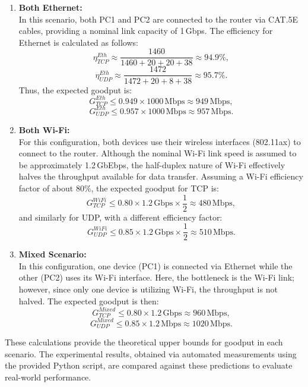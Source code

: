         \begin{enumerate}

            \item \textbf{Both Ethernet:} \\
            In this scenario, both PC1 and PC2 are connected to the router via CAT.5E cables, providing a nominal link capacity of 1\,Gbps. 
            The efficiency for Ethernet is calculated as follows:
            \[
            \eta_{TCP}^{Eth} \approx \frac{1460}{1460 + 20 + 20 + 38} \approx 94.9\%,
            \]
            \[
            \eta_{UDP}^{Eth} \approx \frac{1472}{1472 + 20 + 8 + 38} \approx 95.7\%.
            \]
            Thus, the expected goodput is:
            \[
            G_{TCP}^{Eth} \leq 0.949 \times 1000\,\text{Mbps} \approx 949\,\text{Mbps},
            \]
            \[
            G_{UDP}^{Eth} \leq 0.957 \times 1000\,\text{Mbps} \approx 957\,\text{Mbps}.
            \]

            \vspace{0.2cm} %

            \item \textbf{Both Wi-Fi:} \\
            For this configuration, both devices use their wireless interfaces (802.11ax) to connect to the router. 
            Although the nominal Wi-Fi link speed is assumed to be approximately 1.2\,GbEbps, the half-duplex nature of Wi-Fi effectively halves the throughput available for data transfer. 
            Assuming a Wi-Fi efficiency factor of about 80\%, the expected goodput for TCP is:
            \[
            G_{TCP}^{WiFi} \leq 0.80 \times 1.2\,\text{Gbps} \times \frac{1}{2} \approx 480\,\text{Mbps},
            \]
            and similarly for UDP, with a different efficiency factor:
            \[
            G_{UDP}^{WiFi} \leq 0.85 \times 1.2\,\text{Gbps} \times \frac{1}{2} \approx 510\,\text{Mbps}.
            \]


            \item \textbf{Mixed Scenario:} \\
            In this configuration, one device (PC1) is connected via Ethernet while the other (PC2) uses its Wi-Fi interface. 
            Here, the bottleneck is the Wi-Fi link; however, since only one device is utilizing Wi-Fi, the throughput is not halved. 
            The expected goodput is then:
            \[
            G_{TCP}^{Mixed} \leq 0.80 \times 1.2\,\text{Gbps} \approx 960\,\text{Mbps},
            \]
            \[
            G_{UDP}^{Mixed} \leq 0.85 \times 1.2\,\text{Mbps} \approx 1020\,\text{Mbps}.
            \]

        \end{enumerate}

        These calculations provide the theoretical upper bounds for goodput in each scenario. 
        The experimental results, obtained via automated measurements using the provided Python script, are compared against these predictions to evaluate real-world performance.

        \medskip